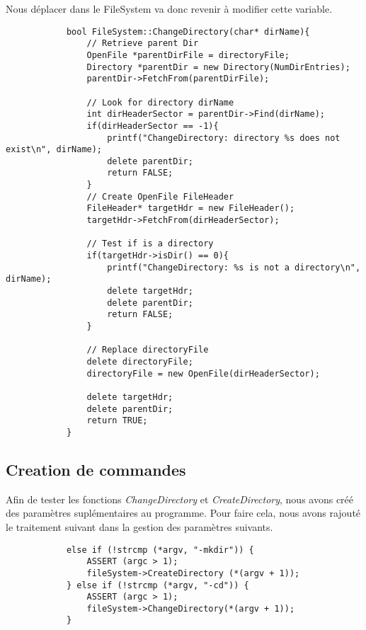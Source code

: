 \documentclass[a4paper,10pt]{article}
\begin{document}
        Nous déplacer dans le FileSystem va donc revenir à modifier cette variable.
        \begin{lstlisting}
            bool FileSystem::ChangeDirectory(char* dirName){
                // Retrieve parent Dir
                OpenFile *parentDirFile = directoryFile;
                Directory *parentDir = new Directory(NumDirEntries);
                parentDir->FetchFrom(parentDirFile);

                // Look for directory dirName
                int dirHeaderSector = parentDir->Find(dirName);
                if(dirHeaderSector == -1){
                    printf("ChangeDirectory: directory %s does not exist\n", dirName);
                    delete parentDir;
                    return FALSE;
                }
                // Create OpenFile FileHeader
                FileHeader* targetHdr = new FileHeader();
                targetHdr->FetchFrom(dirHeaderSector);

                // Test if is a directory
                if(targetHdr->isDir() == 0){
                    printf("ChangeDirectory: %s is not a directory\n", dirName);
                    delete targetHdr;
                    delete parentDir;
                    return FALSE;
                }

                // Replace directoryFile
                delete directoryFile;
                directoryFile = new OpenFile(dirHeaderSector);

                delete targetHdr;
                delete parentDir;
                return TRUE;
            }
        \end{lstlisting}

    \newpage
    \subsection{Creation de commandes}
        Afin de tester les fonctions \textit{ChangeDirectory} et \textit{CreateDirectory}, nous
        avons créé des paramètres suplémentaires au programme. Pour faire cela, nous avons
        rajouté le traitement suivant dans la gestion des paramètres suivants.
        \begin{lstlisting}
            else if (!strcmp (*argv, "-mkdir")) {
                ASSERT (argc > 1);
                fileSystem->CreateDirectory (*(argv + 1));
            } else if (!strcmp (*argv, "-cd")) {
                ASSERT (argc > 1);
                fileSystem->ChangeDirectory(*(argv + 1));
            }
        \end{lstlisting}
\end{document}
